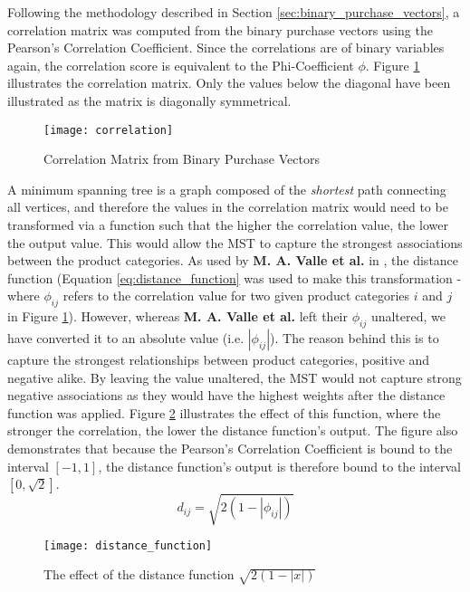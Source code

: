 Following the methodology described in Section \ref{sec:binary_purchase_vectors}, a correlation matrix was computed from the binary purchase vectors using the Pearson's Correlation Coefficient. Since the correlations are of binary variables again, the correlation score is equivalent to the Phi-Coefficient $\phi$. Figure \ref{fig:correlation} illustrates the correlation matrix. Only the values below the diagonal have been illustrated as the matrix is diagonally symmetrical.





\begin{figure}[H]
\centering
\texttt{[image: correlation]}
\caption{Correlation Matrix from Binary Purchase Vectors}
\label{fig:correlation}
\end{figure}

A minimum spanning tree is a graph composed of the \textit{shortest} path connecting all vertices, and therefore the values in the correlation matrix would need to be transformed via a function such that the higher the correlation value, the lower the output value. This would allow the MST to capture the strongest associations between the product categories. As used by \textbf{M. A. Valle et al.} in , the distance function (Equation \ref{eq:distance_function}  was used to make this transformation - where $\phi_{ij}$ refers to the correlation value for two given product categories $i$ and $j$ in Figure \ref{fig:correlation}). However, whereas \textbf{M. A. Valle et al.} left their $\phi_{ij}$ unaltered, we have converted it to an absolute value (i.e. $|\phi_{ij}|$). The reason behind this is to capture the strongest relationships between product categories, positive and negative alike. By leaving the value unaltered, the MST would not capture strong negative associations as they would have the highest weights after the distance function was applied. Figure \ref{fig:distance_function} illustrates the effect of this function, where the stronger the correlation, the lower the distance function's output. The figure also demonstrates that because the Pearson's Correlation Coefficient is bound to the interval $[-1,1]$, the distance function's output is therefore bound to the interval $[0,\sqrt{2}]$. 
\begin{equation}
\label{eq:distance_function}
d_{ij} = \sqrt{2(1-|\phi_{ij}|)}
\end{equation}

\begin{figure}[H]
\centering
\texttt{[image: distance\_function]}
\label{fig:distance_function}
\caption{The effect of the distance function $\sqrt{2(1-|x|)}$}
\end{figure}

